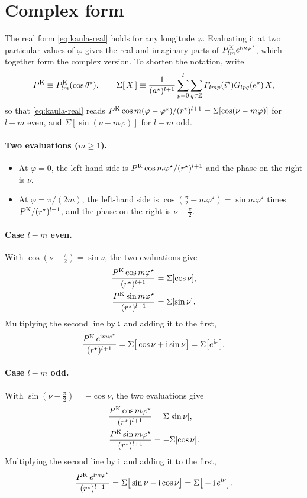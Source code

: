 \section{Complex form}
The real form \eqref{eq:kaula-real} holds for any longitude $\varphi$. Evaluating it at two particular values of $\varphi$ gives the real and imaginary parts of $P^{\mathrm K}_{lm}e^{\mathrm{i} m\varphi^\star}$, which together form the complex version. To shorten the notation, write
\[
  P^{\mathrm K}\equiv P^{\mathrm K}_{lm}(\cos\theta^\star),\qquad \Sigma[\,X\,]\equiv\frac{1}{(a^\star)^{l+1}}\sum_{p=0}^{l}\sum_{q\in\mathbb Z}F_{lmp}(i^\star)G_{lpq}(e^\star)\,X,
\]
so that \eqref{eq:kaula-real} reads $P^{\mathrm K}\cos m(\varphi-\varphi^\star)/(r^\star)^{l+1}=\Sigma[\cos(\nu-m\varphi)]$ for $l-m$ even, and $\Sigma[\sin(\nu-m\varphi)]$ for $l-m$ odd.

\paragraph{Two evaluations ($m\ge1$).}
\begin{itemize}
  \item At $\varphi=0$, the left-hand side is $P^{\mathrm K}\cos m\varphi^\star/(r^\star)^{l+1}$ and the phase on the right is $\nu$.
  \item At $\varphi=\pi/(2m)$, the left-hand side is $\cos(\tfrac\pi2-m\varphi^\star)=\sin m\varphi^\star$ times $P^{\mathrm K}/(r^\star)^{l+1}$, and the phase on the right is $\nu-\tfrac\pi2$.
\end{itemize}

\paragraph{Case $l-m$ even.} With $\cos(\nu-\tfrac\pi2)=\sin\nu$, the two evaluations give
\begin{align*}
  \frac{P^{\mathrm K}\cos m\varphi^\star}{(r^\star)^{l+1}}&=\Sigma[\cos\nu],\\
  \frac{P^{\mathrm K}\sin m\varphi^\star}{(r^\star)^{l+1}}&=\Sigma[\sin\nu].
\end{align*}
Multiplying the second line by $\mathrm{i}$ and adding it to the first,
\[
  \frac{P^{\mathrm K}\,e^{\mathrm{i} m\varphi^\star}}{(r^\star)^{l+1}}=\Sigma\big[\cos\nu+\mathrm{i}\sin\nu\big]=\Sigma\big[e^{\mathrm{i}\nu}\big].
\]

\paragraph{Case $l-m$ odd.} With $\sin(\nu-\tfrac\pi2)=-\cos\nu$, the two evaluations give
\begin{align*}
  \frac{P^{\mathrm K}\cos m\varphi^\star}{(r^\star)^{l+1}}&=\Sigma[\sin\nu],\\
  \frac{P^{\mathrm K}\sin m\varphi^\star}{(r^\star)^{l+1}}&=-\Sigma[\cos\nu].
\end{align*}
Multiplying the second line by $\mathrm{i}$ and adding it to the first,
\[
  \frac{P^{\mathrm K}\,e^{\mathrm{i} m\varphi^\star}}{(r^\star)^{l+1}}=\Sigma\big[\sin\nu-\mathrm{i}\cos\nu\big]=\Sigma\big[-\mathrm{i}\,e^{\mathrm{i}\nu}\big].
\]


